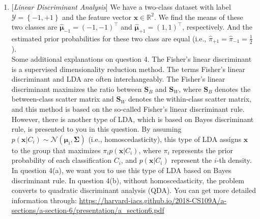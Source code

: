 \documentclass[10pt]{article}
\begin{document}
\begin{enumerate}
\item {} {[}\textit{Linear Discriminant Analysis}{]} We have
a two-class dataset with label $\mathcal{Y}=\left\{ -1,+1\right\} $
and the feature vector $\bm{x}\in\mathbb{R}^{2}$. We find the means
of these two classes are $\hat{\mathbf{\bm{\mu}}}_{-1}=\left(-1,-1\right)^{\top}$
and $\hat{\mathbf{\bm{\mu}}}_{+1}=\left(1,1\right)^{\top}$, respectively.
And the estimated prior probabilities for these two class are equal
(i.e., $\hat{\pi}_{+1}=\hat{\pi}_{-1}=\frac{1}{2}$).\\
 Some additional explanations on question 4. The Fisher's linear discriminant is a supervised dimensionality
reduction method. The terms Fisher's linear discriminant and LDA are
often interchangeably. The  Fisher's linear discriminant maximizes the ratio between $\bm{S}_{B}$
and $\bm{S}_{W}$, where $\bm{S}_{B}$ denotes the between-class scatter
matrix and $\bm{S}_{W}$ denotes the within-class scatter matrix, and this
method is based on the so-called Fisher's linear discriminant rule.
However, there is another type of LDA, which is based on Bayes discriminant
rule, is presented to you in this question. By assuming $p\left(\bm{x}\left|C_{i}\right.\right)\sim\mathcal{N}\left(\bm{\mu}_{i},\bm{\Sigma}\right)$
(i.e., homoscedasticity), this type of LDA assigns $\bm{x}$ to the
group that maximizes $\pi_{i}p\left(\bm{x}\left|C_{i}\right.\right)$,
where $\pi_{i}$ represents the prior probability of each classification
$C_{i}$, and $p\left(\bm{x}\left|C_{i}\right.\right)$ represent
the $i$-th density. In question 4(a), we want you to use this type
of LDA based on Bayes discriminant rule. In question 4(b), without
homoscedasticity, the problem converts to quadratic discriminant analysis
(QDA). You can get more detailed information through:  \url{https://harvard-iacs.github.io/2018-CS109A/a-sections/a-section-6/presentation/a_section6.pdf}\\


\end{enumerate}
\end{document}

